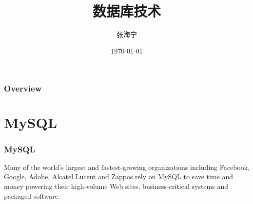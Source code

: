 \documentclass{beamer}
\title[database]{数据库技术} %
\author{张海宁} %
\institute[贵大计算机] %
{
贵州大学 \\ %
\medskip
\textit{hnzhang1@gzu.edu.cn} %
}
\date{\today} %
\begin{document}
\begin{frame}
\titlepage %
\end{frame}

\begin{frame}
\frametitle{Overview} %
\tableofcontents %
\end{frame}


\section{MySQL} %
\begin{frame}
\frametitle{MySQL}
Many of the world's largest and fastest-growing organizations including Facebook, Google, Adobe, Alcatel Lucent and Zappos rely on MySQL to save time and money powering their high-volume Web sites, business-critical systems and packaged software.
\end{frame}
\end{document}

